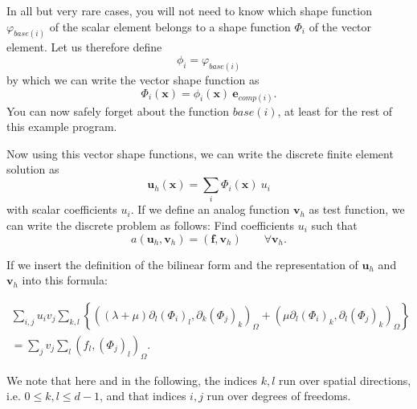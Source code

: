 \documentclass{article}
\renewcommand{\vec}[1]{{\mathbf #1}}
\begin{document}
In all but very rare cases, you will not need to know which shape function
$\varphi_{base(i)}$ of the scalar element belongs to a shape function $\Phi_i$
of the vector element. Let us therefore define
$$
  \phi_i = \varphi_{base(i)}
$$
by which we can write the vector shape function as
$$
  \Phi_i(\vec x) = \phi_{i}(\vec x)\ \vec e_{comp(i)}.
$$
You can now safely forget about the function $base(i)$, at least for the rest
of this example program.

Now using this vector shape functions, we can write the discrete finite
element solution as
$$
  \vec u_h(\vec x) = 
  \sum_i \Phi_i(\vec x)\ u_i
$$
with scalar coefficients $u_i$. If we define an analog function $\vec v_h$ as
test function, we can write the discrete problem as follows: Find coefficients
$u_i$ such that
$$
  a(\vec u_h, \vec v_h) = (\vec f, \vec v_h)
  \qquad
  \forall \vec v_h.
$$

If we insert the definition of the bilinear form and the representation of
$\vec u_h$ and $\vec v_h$ into this formula:
\begin{center}
\begin{multline*}
  \sum_{i,j}
    u_i v_j
  \sum_{k,l}
  \left\{
  \left(
    (\lambda+\mu) \partial_l (\Phi_i)_l, \partial_k (\Phi_j)_k
  \right)_\Omega
  +
  \left(
    \mu \partial_l (\Phi_i)_k, \partial_l (\Phi_j)_k
  \right)_\Omega  
  \right\}
\\
=
  \sum_j v_j
  \sum_l
  \left(
    f_l,
    (\Phi_j)_l
  \right)_\Omega.
\end{multline*}
\end{center}
We note that here and in the following, the indices $k,l$ run over spatial
directions, i.e. $0\le k,l \le d-1$, and that indices $i,j$ run over degrees
of freedoms.
\end{document}
